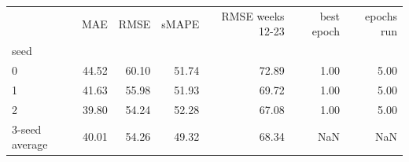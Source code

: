 \begin{tabular}{lrrrrrr}
\toprule
 & MAE & RMSE & sMAPE & RMSE weeks 12-23 & best epoch & epochs run \\
seed &  &  &  &  &  &  \\
\midrule
0 & 44.52 & 60.10 & 51.74 & 72.89 & 1.00 & 5.00 \\
1 & 41.63 & 55.98 & 51.93 & 69.72 & 1.00 & 5.00 \\
2 & 39.80 & 54.24 & 52.28 & 67.08 & 1.00 & 5.00 \\
3-seed average & 40.01 & 54.26 & 49.32 & 68.34 & NaN & NaN \\
\bottomrule
\end{tabular}
